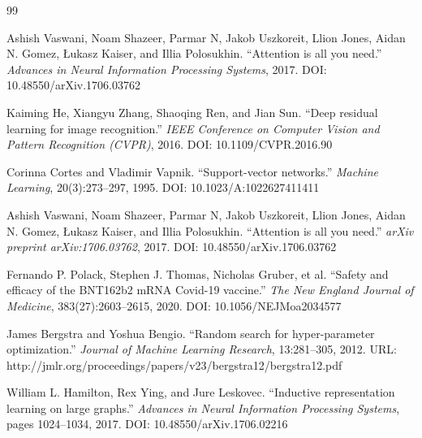 \documentclass{article}
\begin{document}
\begin{thebibliography}{99}

Ashish Vaswani, Noam Shazeer, Parmar N, Jakob Uszkoreit, Llion Jones, Aidan N. Gomez, Łukasz Kaiser, and Illia Polosukhin.
``Attention is all you need.''
\textit{Advances in Neural Information Processing Systems}, 2017.
DOI: 10.48550/arXiv.1706.03762

Kaiming He, Xiangyu Zhang, Shaoqing Ren, and Jian Sun.
``Deep residual learning for image recognition.''
\textit{IEEE Conference on Computer Vision and Pattern Recognition (CVPR)}, 2016.
DOI: 10.1109/CVPR.2016.90

Corinna Cortes and Vladimir Vapnik.
``Support-vector networks.''
\textit{Machine Learning}, 20(3):273--297, 1995.
DOI: 10.1023/A:1022627411411

Ashish Vaswani, Noam Shazeer, Parmar N, Jakob Uszkoreit, Llion Jones, Aidan N. Gomez, Łukasz Kaiser, and Illia Polosukhin.
``Attention is all you need.''
\textit{arXiv preprint arXiv:1706.03762}, 2017.
DOI: 10.48550/arXiv.1706.03762

Fernando P. Polack, Stephen J. Thomas, Nicholas Gruber, et al.
``Safety and efficacy of the BNT162b2 mRNA Covid-19 vaccine.''
\textit{The New England Journal of Medicine}, 383(27):2603--2615, 2020.
DOI: 10.1056/NEJMoa2034577

James Bergstra and Yoshua Bengio.
``Random search for hyper-parameter optimization.''
\textit{Journal of Machine Learning Research}, 13:281--305, 2012.
URL: http://jmlr.org/proceedings/papers/v23/bergstra12/bergstra12.pdf

William L. Hamilton, Rex Ying, and Jure Leskovec.
``Inductive representation learning on large graphs.''
\textit{Advances in Neural Information Processing Systems}, pages 1024--1034, 2017.
DOI: 10.48550/arXiv.1706.02216

\end{thebibliography}
\end{document}
